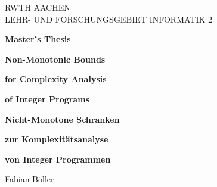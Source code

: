 \thispagestyle{empty}

\begin{center}
  
  \vspace*{-20mm}
  
  \iffalse\texttt{[image: Bilder/ADA\_Logo.jpg]}\fi
  
  \vspace*{1cm}
  
  {\Large RWTH AACHEN\\[1mm]}
  LEHR- UND FORSCHUNGSGEBIET INFORMATIK 2\\
  
  \vspace*{3cm}
  
  {\Large \textbf{Master's Thesis}}\\ 
  
  \vspace{1cm}

  {\Large \textbf{Non-Monotonic Bounds}}\\ 

  \vspace*{1mm}

  {\Large \textbf{for Complexity Analysis}}\\ 

  \vspace*{1mm}

  {\Large \textbf{of Integer Programs}}\\

  \vspace{1.5cm}
  
  {\Large \textbf{Nicht-Monotone Schranken}}\\ 

  \vspace*{1mm}

  {\Large \textbf{zur Komplexitätsanalyse}}\\ 

  \vspace*{1mm}

  {\Large \textbf{von Integer Programmen}}\\
  
  \vspace{1.5cm}
  
  {\LARGE Fabian Böller}\\[35mm]
  

\end{center}
